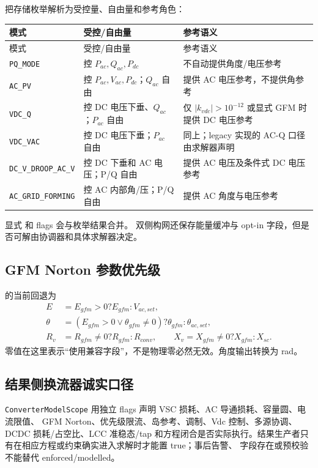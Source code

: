把存储枚举解析为受控量、自由量和参考角色：
\begin{center}\footnotesize
\begin{longtable}{@{}L{3.5cm}L{5.2cm}L{6.5cm}@{}}
\toprule 模式 & 受控/自由量 & 参考语义\\\midrule
\endfirsthead
\toprule 模式 & 受控/自由量 & 参考语义\\\midrule\endhead
\texttt{PQ\_MODE} & 控 $P_{ac},Q_{ac},P_{dc}$ & 不自动提供角度/电压参考\\
\texttt{AC\_PV} & 控 $P_{ac},V_{ac},P_{dc}$；$Q_{ac}$ 自由 & 提供 AC 电压参考，不提供角参考\\
\texttt{VDC\_Q} & 控 DC 电压下垂、$Q_{ac}$；$P_{ac}$ 自由 & 仅 $|k_{vdc}|>10^{-12}$ 或显式 GFM 时提供 DC 电压参考\\
\texttt{VDC\_VAC} & 控 DC 电压下垂；$P_{ac}$ 自由 & 同上；legacy 实现的 AC-Q 口径由求解器声明\\
\texttt{DC\_V\_DROOP\_AC\_V} & 控 DC 下垂和 AC 电压；P/Q 自由 & 提供 AC 电压及条件式 DC 电压参考\\
\texttt{AC\_GRID\_FORMING} & 控 AC 内部角/压；P/Q 自由 & 提供 AC 角度与电压参考\\
\bottomrule
\end{longtable}
\end{center}

显式  和  flags 会与枚举结果合并。
双侧构网还保存能量缓冲与 opt-in 字段，但是否可解由协调器和具体求解器决定。

\subsection{GFM Norton 参数优先级}

 的当前回退为
\begin{align}
E&=E_{gfm}>0?E_{gfm}:V_{ac,set},\\
\theta&=(E_{gfm}>0\lor\theta_{gfm}\ne0)?\theta_{gfm}:\theta_{ac,set},\\
R_v&=R_{gfm}\ne0?R_{gfm}:R_{conv},\qquad
X_v=X_{gfm}\ne0?X_{gfm}:X_{sc}.
\end{align}
零值在这里表示“使用兼容字段”，不是物理零必然无效。角度输出转换为 rad。

\subsection{结果侧换流器诚实口径}

\texttt{ConverterModelScope} 用独立 flags 声明 VSC 损耗、AC 导通损耗、容量圆、电流限值、
GFM Norton、优先级限流、岛参考、调制、Vdc 控制、多源协调、DCDC 损耗/占空比、LCC 准稳态/tap
和方程闭合是否实际执行。结果生产者只有在相应方程或约束确实进入求解时才能置 true；事后告警、
字段存在或预校验不能替代 enforced/modelled。

